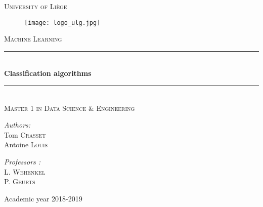 \documentclass[12pt]{article}
\newcommand{\HRule}{\rule{\linewidth}{0.5mm}}
\begin{document}
 
\begin{titlepage}


  \begin{sffamily}
  \begin{center}

   
    \textsc{\Large University of Liège}\\[0.8cm]
    
    \begin{figure}[h!]
		\begin{center}
		\texttt{[image: logo\_ulg.jpg]}\\[1cm]
		\end{center}
	\end{figure}
	

    \textsc{\Large Machine Learning}\\[1.1cm]

    
    \HRule \\[0.4cm]
    { \LARGE \bfseries Classification algorithms\\[0.4cm] }

    \HRule \\[0.5cm]
    
    \textsc{Master 1 in Data Science \& Engineering} \\[2.5cm]

   \begin{minipage}{0.4\textwidth}
      \begin{flushleft} \large
        \emph{Authors:}\\
        Tom \textsc{Crasset}\\
        Antoine \textsc{Louis} 
      \end{flushleft}
    \end{minipage}
    \begin{minipage}{0.4\textwidth}
      \begin{flushright} \large
        \emph{Professors :}\\
        L. \textsc{Wehenkel}\\
        P. \textsc{Geurts}\\

      \end{flushright}
    \end{minipage}
    


    \vfill

    
    {\large Academic year 2018-2019}

  \end{center}
  \end{sffamily}
\end{titlepage}
\end{document}
